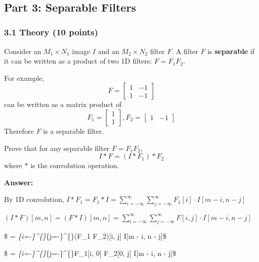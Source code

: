 \documentclass[11pt]{article}
\begin{document}
    \begin{center}
    \end{center}
    { \hspace*{\fill} \\}
    
    \hypertarget{part-3-separable-filters}{%
\subsection{Part 3: Separable Filters}\label{part-3-separable-filters}}

    \hypertarget{theory-10-points}{%
\subsubsection{3.1 Theory (10 points)}\label{theory-10-points}}

Consider an \(M_1\times{N_1}\) image \(I\) and an \(M_2\times{N_2}\)
filter \(F\). A filter \(F\) is \textbf{separable} if it can be written
as a product of two 1D filters: \(F=F_1F_2\).

For example, \[F=
\begin{bmatrix}
1 & -1 \\
1 & -1
\end{bmatrix}
\] can be written as a matrix product of \[F_1=
\begin{bmatrix}
1  \\
1
\end{bmatrix},
F_2=
\begin{bmatrix}
1 & -1
\end{bmatrix}
\] Therefore \(F\) is a separable filter.

Prove that for any separable filter \(F=F_1F_2\), \[I*F=(I*F_1)*F_2\]
where \(*\) is the convolution operation.

    \textbf{Answer:}

By 1D convolution,
\(I * F_1 = F_1 * I = \sum_{i=-\infty}^{\infty}\sum_{j=-\infty}^{\infty}F_1[i] \cdot I[m - i, n - j]\)

\((I * F)[m, n] = (F * I)[m, n] = \sum_{i=-\infty}^{\infty}\sum_{j=-\infty}^{\infty}F[i, j] \cdot I[m - i, n - j]\)

\$ =
\sum\emph{\{i=-\infty\}\^{}\{\infty\}\sum}\{j=-\infty\}\^{}\{\infty\}(F\_1
F\_2){[}i, j{]} \cdot I{[}m - i, n - j{]}\$

\$ =
\sum\emph{\{i=-\infty\}\^{}\{\infty\}\sum}\{j=-\infty\}\^{}\{\infty\}F\_1{[}i,
0{]} \cdot F\_2{[}0, j{]} \cdot I{[}m - i, n - j{]}\$
\end{document}
